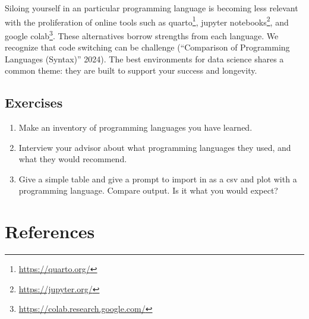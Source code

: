 \documentclass[
  letterpaper,
]{krantz}
\renewcommand{\href}[2]{#2\footnote{\url{#1}}}
\begin{document}
Siloing yourself in an particular programming language is becoming less
relevant with the proliferation of online tools such as
\href{https://quarto.org/}{quarto}, \href{https://jupyter.org/}{jupyter
notebooks}, and \href{https://colab.research.google.com/}{google colab}.
These alternatives borrow strengths from each language. We recognize
that code switching can be challenge ({``Comparison of Programming
Languages (Syntax)''} 2024). The best environments for data science
shares a common theme: they are built to support your success and
longevity.

\section{Exercises}\label{exercises}

\begin{enumerate}
\def\labelenumi{\arabic{enumi}.}
\item
  Make an inventory of programming languages you have learned.
\item
  Interview your advisor about what programming languages they used, and
  what they would recommend.
\item
  Give a simple table and give a prompt to import in as a csv and plot
  with a programming language. Compare output. Is it what you would
  expect?
\end{enumerate}


\chapter*{References}\label{references}

\end{document}
